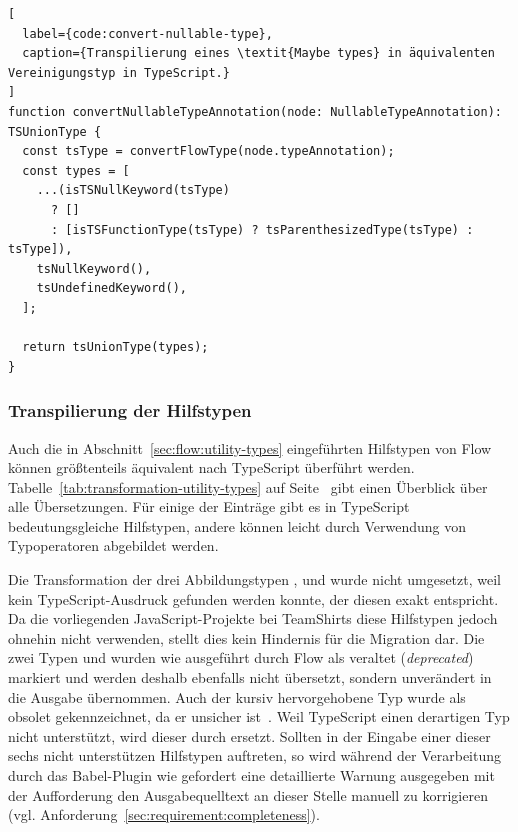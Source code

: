 {\begin{lstlisting}[
  label={code:convert-nullable-type},
  caption={Transpilierung eines \textit{Maybe types} in äquivalenten Vereinigungstyp in TypeScript.}
]
function convertNullableTypeAnnotation(node: NullableTypeAnnotation): TSUnionType {
  const tsType = convertFlowType(node.typeAnnotation);
  const types = [
    ...(isTSNullKeyword(tsType)
      ? []
      : [isTSFunctionType(tsType) ? tsParenthesizedType(tsType) : tsType]),
    tsNullKeyword(),
    tsUndefinedKeyword(),
  ];

  return tsUnionType(types);
}
\end{lstlisting}

\subsubsection{Transpilierung der Hilfstypen}

Auch die in Abschnitt~\ref{sec:flow:utility-types} eingeführten Hilfstypen von Flow können größtenteils äquivalent nach TypeScript überführt werden. Tabelle~\ref{tab:transformation-utility-types} auf Seite~\pageref{tab:transformation-utility-types} gibt einen Überblick über alle Übersetzungen. Für einige der Einträge gibt es in TypeScript bedeutungsgleiche Hilfstypen, andere können leicht durch Verwendung von Typoperatoren abgebildet werden.

Die Transformation der drei Abbildungstypen ,  und  wurde nicht umgesetzt, weil kein TypeScript-Ausdruck gefunden werden konnte, der diesen exakt entspricht. Da die vorliegenden JavaScript-Projekte bei TeamShirts diese Hilfstypen jedoch ohnehin nicht verwenden, stellt dies kein Hindernis für die Migration dar. Die zwei Typen  und  wurden wie ausgeführt durch Flow als veraltet (\textit{deprecated}) markiert und werden deshalb ebenfalls nicht übersetzt, sondern unverändert in die Ausgabe übernommen. Auch der kursiv hervorgehobene Typ  wurde als obsolet gekennzeichnet, da er unsicher ist~\autocite{FLOW:LINT_RULE_REFERENCE}. Weil TypeScript einen derartigen Typ nicht unterstützt, wird dieser durch  ersetzt. Sollten in der Eingabe einer dieser sechs nicht unterstützen Hilfstypen auftreten, so wird während der Verarbeitung durch das Babel-Plugin wie gefordert eine detaillierte Warnung ausgegeben mit der Aufforderung den Ausgabequelltext an dieser Stelle manuell zu korrigieren (vgl. Anforderung~\ref{sec:requirement:completeness}).

}
